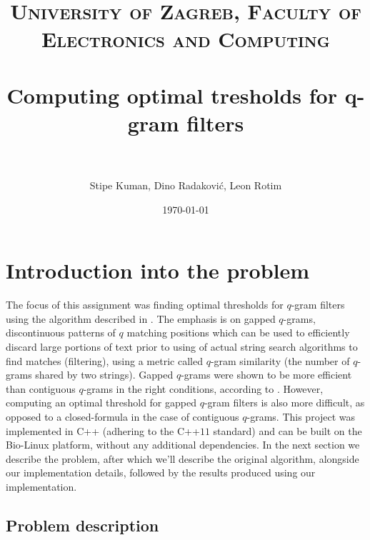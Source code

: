 \documentclass[paper=a4, fontsize=11pt]{scrartcl} %
\title{	
\normalfont \normalsize 
\textsc{University of Zagreb, Faculty of Electronics and Computing} \\ [25pt] %
\horrule{0.5pt} \\[0.4cm] %
\huge Computing optimal tresholds for q-gram filters \\ %
\horrule{2pt} \\[0.5cm] %
}
\author{Stipe Kuman, Dino Radaković, Leon Rotim} %
\date{\normalsize\today} %
\numberwithin{equation}{section} %
\numberwithin{figure}{section} %
\numberwithin{table}{section} %
\begin{document}
\maketitle %


\section{Introduction into the problem}

The focus of this assignment was finding optimal thresholds for $q$-gram filters using the algorithm described in \cite{njihovPaper}. The emphasis is on gapped $q$-grams, discontinuous patterns of $q$ matching positions which can be used to efficiently discard large portions of text prior to using of actual string search algorithms to find matches (filtering), using a metric called $q$-gram similarity (the number of $q$-grams shared by two strings). Gapped $q$-grams were shown to be more efficient than contiguous $q$-grams in the right conditions, according to \cite{njihovPaper}. However, computing an optimal threshold for gapped $q$-gram filters is also more difficult, as opposed to a closed-formula in the case of contiguous $q$-grams. 
This project was implemented in C++ (adhering to the C++$11$ standard) and can be built on the Bio-Linux \cite{biolinux} platform, without any additional dependencies.
In the next section we describe the problem, after which we'll describe the original algorithm, alongside our implementation details, followed by the results
produced using our implementation.


\subsection{Problem description}
\end{document}
